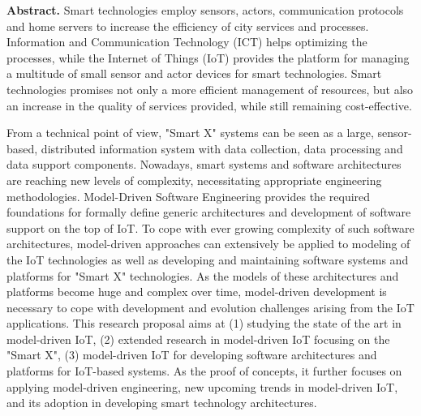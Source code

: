 \textbf{Abstract.} Smart technologies employ sensors, actors, communication protocols and home servers to increase the efficiency of city services and processes. Information and Communication Technology (ICT) helps optimizing the processes, while the Internet of Things (IoT) provides the platform for managing a multitude of small sensor and actor devices for smart technologies. Smart technologies promises not only a more efficient management of resources, but also an increase in the quality of services provided, while still remaining cost-effective. 

From a technical point of view, "Smart X" systems can be seen as a large, sensor-based, distributed information system with data collection, data processing and data support components. Nowadays, smart systems and software architectures are reaching new levels of complexity, necessitating appropriate engineering methodologies. Model-Driven Software Engi­neer­ing provides the required foundations for formally define generic architectures and development of software support on the top of IoT. To cope with ever growing complexity of such software architectures, model-driven approaches can extensively be applied to modeling of the IoT technologies as well as developing and maintaining software systems and platforms for "Smart X" technologies. As the models of these architectures and platforms become huge and complex over time, model-driven development is necessary to cope with development and evolution challenges arising from the IoT applications. This research proposal aims at (1) studying the state of the art in model-driven IoT, (2) extended research in model-driven IoT focusing on the "Smart X", (3) model-driven IoT for developing software architectures and platforms for IoT-based systems. As the proof of concepts, it further focuses on applying model-driven engineering, new upcoming trends in model-driven IoT, and its adoption in developing smart technology architectures.